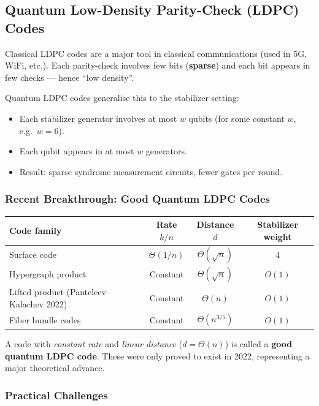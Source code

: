 \documentclass[11pt, a4paper]{article}
\theoremstyle{definition}
\theoremstyle{plain}
\theoremstyle{remark}
\begin{document}
\subsection{Quantum Low-Density Parity-Check (LDPC) Codes}

Classical LDPC codes are a major tool in classical communications (used in
5G, WiFi, etc.).  Each parity-check involves few bits (\textbf{sparse}) and
each bit appears in few checks --- hence ``low density''.

Quantum LDPC codes generalise this to the stabilizer setting:
\begin{itemize}
  \item Each stabilizer generator involves at most $w$ qubits (for some
        constant $w$, e.g.\ $w=6$).
  \item Each qubit appears in at most $w$ generators.
  \item Result: sparse syndrome measurement circuits, fewer gates per round.
\end{itemize}

\subsubsection{Recent Breakthrough: Good Quantum LDPC Codes}

\begin{center}
\renewcommand{\arraystretch}{1.3}
\begin{tabular}{@{} l c c c @{}}
  \toprule
  \textbf{Code family} & \textbf{Rate $k/n$} & \textbf{Distance $d$}
    & \textbf{Stabilizer weight}\\
  \midrule
  Surface code & $\Theta(1/n)$ & $\Theta(\sqrt{n})$ & 4\\
  Hypergraph product & Constant & $\Theta(\sqrt{n})$ & $O(1)$\\
  Lifted product (Panteleev--Kalachev 2022) & Constant & $\Theta(n)$ & $O(1)$\\
  Fiber bundle codes & Constant & $\Theta(n^{3/5})$ & $O(1)$\\
  \bottomrule
\end{tabular}
\end{center}

A code with \emph{constant rate} and \emph{linear distance} ($d = \Theta(n)$)
is called a \textbf{good quantum LDPC code}.  These were only proved to exist
in 2022, representing a major theoretical advance.

\subsubsection{Practical Challenges}
\end{document}
